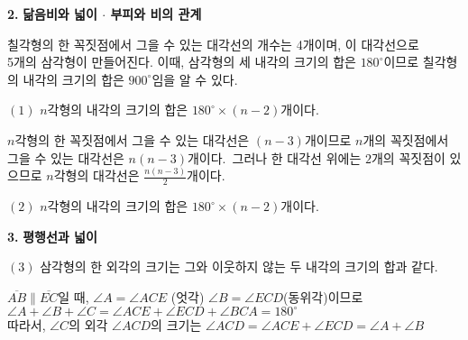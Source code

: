 
\begin{flushleft}
    {\setmainfont[Path=FONT/]{KOPUBWORLD_DOTUM_PRO_BOLD.OTF}\textcolor{skyblue2}{{\huge\textbf{2.}}}}
    {\textcolor{skyblue2}{{\huge\textbf{닮음비와 넓이 $\cdot$ 부피와 비의 관계}}}}

\end{flushleft}

\begin{flushleft}
    칠각형의 한 꼭짓점에서 그을 수 있는 대각선의 개수는 4개이며, 
    이 대각선으로 \\ 5개의 삼각형이 만들어진다.
    이때, 삼각형의 세 내각의 크기의 합은 $180^{\circ}$이므로
    칠각형의 내각의 크기의 합은 $900^{\circ}$임을 알 수 있다. 
\end{flushleft}

\begin{flushleft}
    $(1)$ $n$각형의 내각의 크기의 합은 $180^{\circ} \times (n-2)$개이다.
\end{flushleft}

\begin{tcolorbox}[colback = white, colframe = blue!35!skyblue, title = \textmd{이해하기}]
    $n$각형의 한 꼭짓점에서 그을 수 있는 대각선은 $(n-3)$개이므로
    $n$개의 꼭짓점에서 그을 수 있는 대각선은 $n(n-3)$개이다.
    \,그러나 한 대각선 위에는 $2$개의 꼭짓점이 있으므로 $n$각형의 대각선은
    $\frac{n(n-3)}{2}$개이다.
\end{tcolorbox}

\begin{flushleft}
    $(2)$ $n$각형의 내각의 크기의 합은 $180^{\circ} \times (n-2)$개이다.
\end{flushleft}



\begin{flushleft}
    {\setmainfont[Path=FONT/]{KOPUBWORLD_DOTUM_PRO_BOLD.OTF}\textcolor{skyblue2}{{\huge\textbf{3.}}}}
    {\textcolor{skyblue2}{{\huge\textbf{평행선과 넓이}}}}
\end{flushleft}

\begin{flushleft}
    $(3)$ 삼각형의 한 외각의 크기는 그와 이웃하지 않는 두 내각의 크기의 합과 같다.
\end{flushleft}

\begin{tcolorbox}[colback = white, colframe = blue!35!skyblue, title = \textmd{이해하기}]
    $\overline{AB} \parallel \overline{EC}$일 때, $\angle A = \angle ACE$ (엇각) $\angle B = \angle ECD$(동위각)이므로\\ 
    $\angle A + \angle B + \angle C = \angle ACE + \angle ECD + \angle BCA = 180^{\circ}$ \\
    따라서, $\angle C$의 외각 $\angle ACD$의 크기는 $\angle ACD = \angle ACE + \angle ECD = \angle A + \angle B$
\end{tcolorbox}


